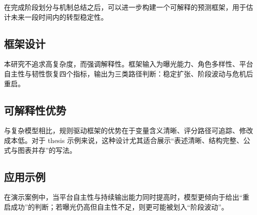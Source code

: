 在完成阶段划分与机制总结之后，可以进一步构建一个可解释的预测框架，用于估计未来一段时间内的转型稳定性。

\subsection{框架设计}

本研究不追求高复杂度，而强调解释性。框架输入为曝光能力、角色多样性、平台自主性与韧性恢复四个指标，输出为三类路径判断：稳定扩张、阶段波动与危机后重启。

\subsection{可解释性优势}

与复杂模型相比，规则驱动框架的优势在于变量含义清晰、评分路径可追踪、修改成本低。对于 thesis 示例来说，这种设计尤其适合展示“表述清晰、结构完整、公式与图表并存”的写法。

\subsection{应用示例}

在演示案例中，当平台自主性与持续输出能力同时提高时，模型更倾向于给出“重启成功”的判断；若曝光仍高但自主性不足，则更可能被划入“阶段波动”。
